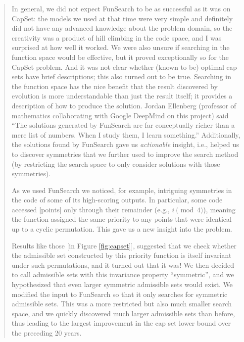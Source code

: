 \begin{quote}

In general, we did not expect FunSearch to be as successful as it was on CapSet: the models we used at that time were very simple and definitely did not have any advanced knowledge about the problem domain, so the creativity was a product of hill climbing in the code space, and I was surprised at how well it worked. 
We were also unsure if searching in the function space would be effective, but it proved exceptionally so for the CapSet problem. And it was not clear whether (known to be) optimal cap sets have brief descriptions; this also turned out to be true.
Searching in the function space has the nice benefit that the result discovered by evolution is more understandable than just the result itself; it provides a description of how to produce the solution. 
Jordan Ellenberg (professor of mathematics collaborating with Google DeepMind on this project) said ``The solutions generated by FunSearch are far conceptually richer than a mere list of numbers. When I study them, I learn something.''
Additionally, the solutions found by FunSearch gave us \emph{actionable} insight, i.e., helped us to discover symmetries that we further used to improve the search method (by restricting the search space to only consider solutions with those symmetries).

As we used FunSearch we noticed, for example, intriguing symmetries in the code of some of its high-scoring outputs. 
In particular, some code accessed [points] only through their remainder (e.g., $i \pmod 4$), meaning the function assigned the same priority to any points that were identical up to a cyclic permutation. 
This gave us a new insight into the problem.

Results like those [in Figure \ref{fig:capset}], suggested that we check whether the admissible set constructed by this priority function is itself invariant under such permutations, and it turned out that it was! 
We then decided to call admissible sets with this invariance property ``symmetric'', and we hypothesized that even larger symmetric admissible sets would exist. 
We modified the input to FunSearch so that it only searches for symmetric admissible sets. 
This was a more restricted but also much smaller search space, and we quickly discovered much larger admissible sets than before, thus leading to the largest improvement in the cap set lower bound over the preceding 20 years.

\end{quote}

